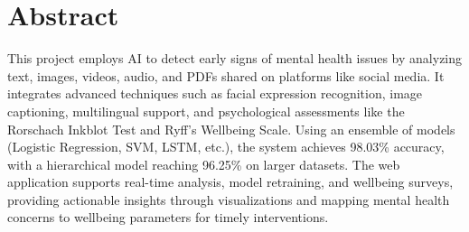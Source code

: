 

\section*{Abstract} 




\noindent
This project employs AI to detect early signs of mental health issues by analyzing text, images, videos, audio, and PDFs shared on platforms like social media. It integrates advanced techniques such as facial expression recognition, image captioning, multilingual support, and psychological assessments like the Rorschach Inkblot Test and Ryff's Wellbeing Scale. Using an ensemble of models (Logistic Regression, SVM, LSTM, etc.), the system achieves 98.03\% accuracy, with a hierarchical model reaching 96.25\% on larger datasets. The web application supports real-time analysis, model retraining, and wellbeing surveys, providing actionable insights through visualizations and mapping mental health concerns to wellbeing parameters for timely interventions.



\newpage